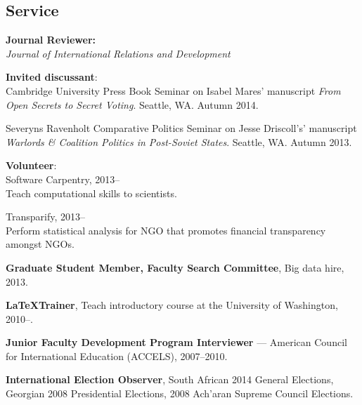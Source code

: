 \documentclass[margin,line]{res}
\begin{document}
{\begin{resume}
\section{\sc Service}
\textbf{Journal Reviewer: }\\
\emph{Journal of International Relations and
  Development} \par\smallskip
\textbf{Invited discussant}: \\
  Cambridge University Press Book Seminar on
Isabel Mares' manuscript \emph{From Open Secrets to Secret Voting}. Seattle, WA. Autumn 2014. \par\smallskip
 Severyns Ravenholt Comparative Politics Seminar on
Jesse Driscoll's' manuscript \emph{Warlords \& Coalition Politics in
  Post-Soviet States}. Seattle, WA. Autumn 2013. \par\smallskip
\textbf{Volunteer}: \\
Software Carpentry, 2013--  \\
Teach computational skills to
scientists.\par\smallskip
Transparify, 2013--\\
 Perform statistical analysis for NGO that promotes
financial transparency amongst NGOs.  \par\smallskip
\textbf{Graduate Student Member, Faculty Search Committee}, Big data
hire, 2013. \par\smallskip
\textbf{\LaTeX Trainer}, Teach introductory \latex course at the University of
Washington, 2010--. \par\smallskip
\textbf{Junior Faculty Development Program Interviewer} --- American Council for
International Education (ACCELS), 2007--2010. \par\smallskip
\textbf{International Election Observer}, South African 2014 General
Elections, Georgian 2008 Presidential Elections, 2008 Ach'aran Supreme
Council Elections. 


\end{resume}}
\end{document}
